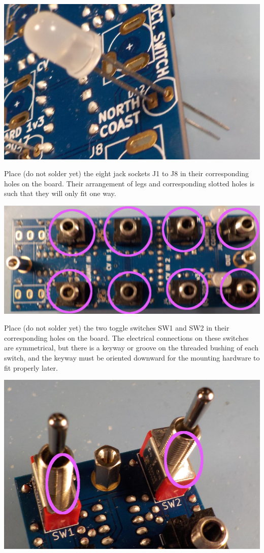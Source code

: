 \noindent\includegraphics[width=\linewidth]{led.jpg}

Place (do not solder yet) the eight jack sockets J1 to J8 in their
corresponding holes on the board.  Their arrangement of legs and
corresponding slotted holes is such that they will only fit one way.

\noindent\includegraphics[width=\linewidth]{sockets.jpg}

Place (do not solder yet) the two toggle switches SW1 and SW2 in their
corresponding holes on the board.  The electrical connections on these
switches are symmetrical, but there is a keyway or groove on the threaded
bushing of each switch, and the keyway must be oriented downward for the
mounting hardware to fit properly later.

\noindent\includegraphics[width=\linewidth]{keyways.jpg}

